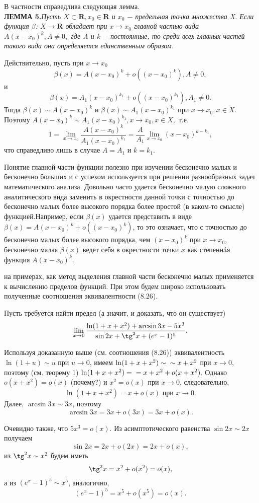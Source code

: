 \documentclass[a4paper, 12pt]{article}
\begin{document}
\begin{justifying}
В частности справедлива следующая лемма.\\
\textbf{ЛЕММА 5.}\textsl{Пусть $X \subset \mathbf{R}, x_{0} \in \mathbf{R}$ и $x_{0}$ $-$ предельная точка множества X. Если функция $\beta$: $X \to \mathbf{R}$ обладает при $x \to x_{0}$ главной частью вида $A(x - x_{0})^{k}, A \ne 0,$ где A и k $-$ постоянные, то среди всех главных частей такого вида она определяется единственным образом.}

Действительно, пусть при $x \to x_{0}$ \[\beta(x) = A(x - x_{0})^{k} + o((x - x_{0})^{k}), A \ne 0,\] и \[\beta(x) = A_{1}(x - x_{0})^{k_{1}} + o((x - x_{0})^{k_{1}}), A_{1} \ne 0.\]
Тогда $\beta(x) \sim A(x - x_{0})^{k}$ и $\beta(x) \sim A_{1}(x - x_{0})^{k_{1}}$ при $x \to x_{0},x\in X.$
Поэтому $A(x - x_{0})^{k} \sim A_{1}(x - x_{0})^{k_{1}}, x \to x_{0}, x \in X,$ т.е.\[ 1 = \lim_{x\to x_{0}}\frac{A(x - x_{0})^{k}}{A_{1}(x - x_{0})^{k_{1}}} = \frac{A}{A_{1}}\lim_{x \to x_{0}}(x - x_{0})^{k-k_{1}},\] что справедливо лишь в случае $A = A_{1}$ и $k = k_{1}$.

Понятие  главной  части функции полезно при изучении бесконечно малых и бесконечно больших и с успехом используется при решении разнообразных задач математического анализа. Довольно часто удается бесконечно малую\newpage 
\noindent сложного аналитического вида заменить в окрестности данной точки с точностью до бесконечно малых более высокого порядка более простой (в каком-то смысле) функцией.Например, если \(\beta(x)\) удается представить в виде \(\beta(x)=A(x-x_0)^k+o((x-x_0)^k)\), то это означает, что с точностью до бесконечно малых более высокого порядка, чем \((x-x_0)^k\) при \(x\rightarrow x_0\), бесконечно малая \(\beta(x)\) ведет себя в окрестности точки \(x\) как степенн\'aя функция \(A(x-x_0)^k\).

 на примерах, как метод выделения главной части бесконечно малых применяется к вычислению пределов функций. При этом будем широко использовать полученные соотношения эквивалентности (8.26).

Пусть требуется найти предел (а значит, и доказать, что он существует)
\[\lim_{x \rightarrow 0}
\frac{\ln (1+x+x^2)+\arcsin 3x-5x^3}{\sin 2x+\tg^2x+(e^x - 1)^5}.\]

Используя доказанную выше (см. соотношения (8.26)) эквивалентность \(\ln(1+u)\sim u\) при \(u\to 0\), имеем \(\ln(1+x+x^2)\sim \\ \sim x+x^2\) при \(x\to 0\), поэтому (см. теорему 1) \(\ln(1+x+x^2)=\\=x+x^2+o(x+x^2)\). Однако \(o(x+x^2)=o(x)\) (почему?) и \(x^2=o(x)\) при \(x\to 0\), следовательно,
\[ \ln(1+x+x^2)=x+o(x) \text{ при } x\to 0.\] 
Далее, \(\arcsin 3x\sim 3x\), поэтому
\[\arcsin 3x=3x+o(3x)=3x+o(x).\]

Очевидно также, что \(5x^3=o(x)\). Из асимптотического равенства \(\sin 2x\sim 2x\) получаем
\[\sin 2x=2x+o(2x)=2x+o(x),\]
из \(\tg^2x\sim x^2\) будем иметь
\[\tg^2x=x^2+o(x^2)=o(x),\]
а из \((e^x-1)^5\sim x^5\), аналогично,
\[(e^x-1)^5=x^5+o(x^5)=o(x).\]


\end{justifying}
\end{document}
